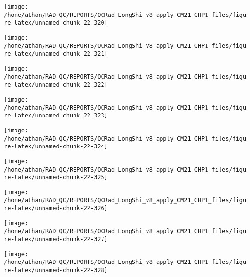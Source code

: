 \documentclass[
  10pt,
  a4paper,oneside]{article}
\begin{document}
\begin{center}\texttt{[image: /home/athan/RAD\_QC/REPORTS/QCRad\_LongShi\_v8\_apply\_CM21\_CHP1\_files/figure-latex/unnamed-chunk-22-320]} \end{center}

\begin{center}\texttt{[image: /home/athan/RAD\_QC/REPORTS/QCRad\_LongShi\_v8\_apply\_CM21\_CHP1\_files/figure-latex/unnamed-chunk-22-321]} \end{center}

\begin{center}\texttt{[image: /home/athan/RAD\_QC/REPORTS/QCRad\_LongShi\_v8\_apply\_CM21\_CHP1\_files/figure-latex/unnamed-chunk-22-322]} \end{center}

\begin{center}\texttt{[image: /home/athan/RAD\_QC/REPORTS/QCRad\_LongShi\_v8\_apply\_CM21\_CHP1\_files/figure-latex/unnamed-chunk-22-323]} \end{center}

\begin{center}\texttt{[image: /home/athan/RAD\_QC/REPORTS/QCRad\_LongShi\_v8\_apply\_CM21\_CHP1\_files/figure-latex/unnamed-chunk-22-324]} \end{center}

\begin{center}\texttt{[image: /home/athan/RAD\_QC/REPORTS/QCRad\_LongShi\_v8\_apply\_CM21\_CHP1\_files/figure-latex/unnamed-chunk-22-325]} \end{center}

\begin{center}\texttt{[image: /home/athan/RAD\_QC/REPORTS/QCRad\_LongShi\_v8\_apply\_CM21\_CHP1\_files/figure-latex/unnamed-chunk-22-326]} \end{center}

\begin{center}\texttt{[image: /home/athan/RAD\_QC/REPORTS/QCRad\_LongShi\_v8\_apply\_CM21\_CHP1\_files/figure-latex/unnamed-chunk-22-327]} \end{center}

\begin{center}\texttt{[image: /home/athan/RAD\_QC/REPORTS/QCRad\_LongShi\_v8\_apply\_CM21\_CHP1\_files/figure-latex/unnamed-chunk-22-328]} \end{center}
\end{document}
